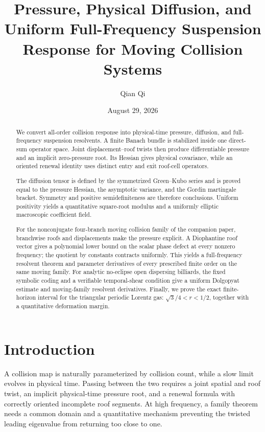 \documentclass[11pt,reqno]{amsart}
\title[Pressure, diffusion, and full-frequency response]{Pressure, Physical Diffusion, and Uniform Full-Frequency Suspension Response for Moving Collision Systems}
\author{Qian Qi}
\date{August 29, 2026}
\theoremstyle{definition}
\theoremstyle{remark}
\begin{document}
\begin{abstract}
We convert all-order collision response into physical-time pressure, diffusion,
and full-frequency suspension resolvents.  A finite Banach bundle is stabilized
inside one direct-sum operator space.  Joint displacement--roof twists then
produce differentiable pressure and an implicit zero-pressure root.  Its
Hessian gives physical covariance, while an oriented renewal identity uses
distinct entry and exit roof-cell operators.

The diffusion tensor is defined by the symmetrized Green--Kubo series and is
proved equal to the pressure Hessian, the asymptotic variance, and the Gordin
martingale bracket.  Symmetry and positive semidefiniteness are therefore
conclusions.  Uniform positivity yields a quantitative square-root modulus and
a uniformly elliptic macroscopic coefficient field.

For the nonconjugate four-branch moving collision family of the companion
paper, branchwise roofs and displacements make the pressure explicit.  A
Diophantine roof vector gives a polynomial lower bound on the scalar phase
defect at every nonzero frequency; the quotient by constants contracts
uniformly.  This yields a full-frequency resolvent theorem and parameter
derivatives of every prescribed finite order on the same moving family.  For
analytic no-eclipse open dispersing billiards, the fixed symbolic coding and a
verifiable temporal-shear condition give a uniform Dolgopyat estimate and
moving-family resolvent derivatives.  Finally, we prove the exact finite-
horizon interval for the triangular periodic Lorentz gas:
$\sqrt3/4<r<1/2$, together with a quantitative deformation margin.
\end{abstract}

\maketitle
\tableofcontents

\section{Introduction}

A collision map is naturally parameterized by collision count, while a slow
limit evolves in physical time.  Passing between the two requires a joint
spatial and roof twist, an implicit physical-time pressure root, and a renewal
formula with correctly oriented incomplete roof segments.  At high frequency,
a family theorem needs a common domain and a quantitative mechanism preventing
the twisted leading eigenvalue from returning too close to one.
\end{document}
